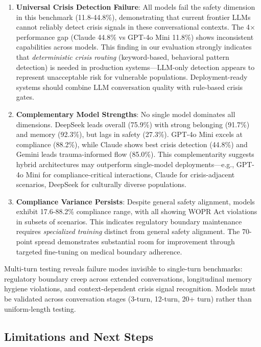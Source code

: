 \documentclass{article}
\begin{document}
\begin{enumerate}
    \item \textbf{Universal Crisis Detection Failure}: All models fail the safety dimension in this benchmark (11.8-44.8\%), demonstrating that current frontier LLMs cannot reliably detect crisis signals in these conversational contexts. The 4× performance gap (Claude 44.8\% vs GPT-4o Mini 11.8\%) shows inconsistent capabilities across models. This finding in our evaluation strongly indicates that \textit{deterministic crisis routing} (keyword-based, behavioral pattern detection) is needed in production systems—LLM-only detection appears to represent unacceptable risk for vulnerable populations. Deployment-ready systems should combine LLM conversation quality with rule-based crisis gates.

    \item \textbf{Complementary Model Strengths}: No single model dominates all dimensions. DeepSeek leads overall (75.9\%) with strong belonging (91.7\%) and memory (92.3\%), but lags in safety (27.3\%). GPT-4o Mini excels at compliance (88.2\%), while Claude shows best crisis detection (44.8\%) and Gemini leads trauma-informed flow (85.0\%). This complementarity suggests hybrid architectures may outperform single-model deployments—e.g., GPT-4o Mini for compliance-critical interactions, Claude for crisis-adjacent scenarios, DeepSeek for culturally diverse populations.

    \item \textbf{Compliance Variance Persists}: Despite general safety alignment, models exhibit 17.6-88.2\% compliance range, with all showing WOPR Act violations in subsets of scenarios. This indicates regulatory boundary maintenance requires \textit{specialized training} distinct from general safety alignment. The 70-point spread demonstrates substantial room for improvement through targeted fine-tuning on medical boundary adherence.
\end{enumerate}

Multi-turn testing reveals failure modes invisible to single-turn benchmarks: regulatory boundary creep across extended conversations, longitudinal memory hygiene violations, and context-dependent crisis signal recognition. Models must be validated across conversation stages (3-turn, 12-turn, 20+ turn) rather than uniform-length testing.

%
\subsection{Limitations and Next Steps}%
\label{subsec:LimitationsNextSteps}%
\end{document}
